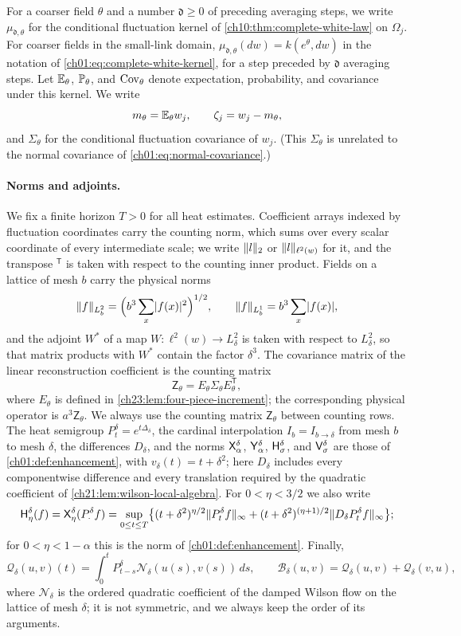 For a coarser field $\theta$ and a number $\mathfrak d\ge0$ of preceding averaging steps, we write $\mu_{\mathfrak d,\theta}$ for the conditional fluctuation kernel of \cref{ch10:thm:complete-white-law} on $\Omega_j$. For coarser fields in the small-link domain, $\mu_{\mathfrak d,\theta}(dw)=k(e^\theta,dw)$ in the notation of \eqref{ch01:eq:complete-white-kernel}, for a step preceded by $\mathfrak d$ averaging steps. Let $\mathbb E_\theta$, $\mathbb P_\theta$, and $\operatorname{Cov}_\theta$ denote expectation, probability, and covariance under this kernel. We write
\[
 m_\theta=\mathbb E_\theta w_j,\qquad \zeta_j=w_j-m_\theta,
\]
and $\Sigma_\theta$ for the conditional fluctuation covariance of $w_j$. (This $\Sigma_\theta$ is unrelated to the normal covariance of \eqref{ch01:eq:normal-covariance}.)

\paragraph{Norms and adjoints.}
We fix a finite horizon $T>0$ for all heat estimates. Coefficient arrays indexed by fluctuation coordinates carry the counting norm, which sums over every scalar coordinate of every intermediate scale; we write $\lVert l\rVert_2$ or $\lVert l\rVert_{\ell^2(w)}$ for it, and the transpose ${}^{\mathsf T}$ is taken with respect to the counting inner product. Fields on a lattice of mesh $b$ carry the physical norms
\[
 \lVert f\rVert_{L^2_b}=\Bigl(b^3\sum_x\lvert f(x)\rvert^2\Bigr)^{1/2},\qquad \lVert f\rVert_{L^1_b}=b^3\sum_x\lvert f(x)\rvert,
\]
and the adjoint $W^*$ of a map $W:\ell^2(w)\to L^2_\delta$ is taken with respect to $L^2_\delta$, so that matrix products with $W^*$ contain the factor $\delta^3$. The covariance matrix of the linear reconstruction coefficient is the counting matrix
\[
 \mathsf Z_\theta=E_\theta\Sigma_\theta E_\theta^{\mathsf T},
\]
where $E_\theta$ is defined in \cref{ch23:lem:four-piece-increment}; the corresponding physical operator is $a^3\mathsf Z_\theta$. We always use the counting matrix $\mathsf Z_\theta$ between counting rows. The heat semigroup $P_t^\delta=e^{t\Delta_\delta}$, the cardinal interpolation $I_b=I_{b\to\delta}$ from mesh $b$ to mesh $\delta$, the differences $D_\delta$, and the norms $\mathsf X_{\alpha}^{\delta}$, $\mathsf Y_{\alpha}^{\delta}$, $\mathsf H_{\sigma}^{\delta}$, and $\mathsf V_{\sigma}^{\delta}$ are those of \cref{ch01:def:enhancement}, with $v_\delta(t)=t+\delta^2$; here $D_\delta$ includes every componentwise difference and every translation required by the quadratic coefficient of \cref{ch21:lem:wilson-local-algebra}. For $0<\eta<3/2$ we also write
\[
 \mathsf H_{\eta}^{\delta}(f)=\mathsf X_{\eta}^{\delta}(P_\cdot^\delta f)
 =\sup_{0\le t\le T}\bigl\{(t+\delta^2)^{\eta/2}\lVert P_t^\delta f\rVert_\infty+(t+\delta^2)^{(\eta+1)/2}\lVert D_\delta P_t^\delta f\rVert_\infty\bigr\};
\]
for $0<\eta<1-\alpha$ this is the norm of \cref{ch01:def:enhancement}. Finally,
\[
 \mathcal Q_\delta(u,v)(t)=\int_0^tP_{t-s}^\delta\mathcal N_\delta(u(s),v(s))\,ds,\qquad
 \mathcal B_\delta(u,v)=\mathcal Q_\delta(u,v)+\mathcal Q_\delta(v,u),
\]
where $\mathcal N_\delta$ is the ordered quadratic coefficient of the damped Wilson flow on the lattice of mesh $\delta$; it is not symmetric, and we always keep the order of its arguments.

